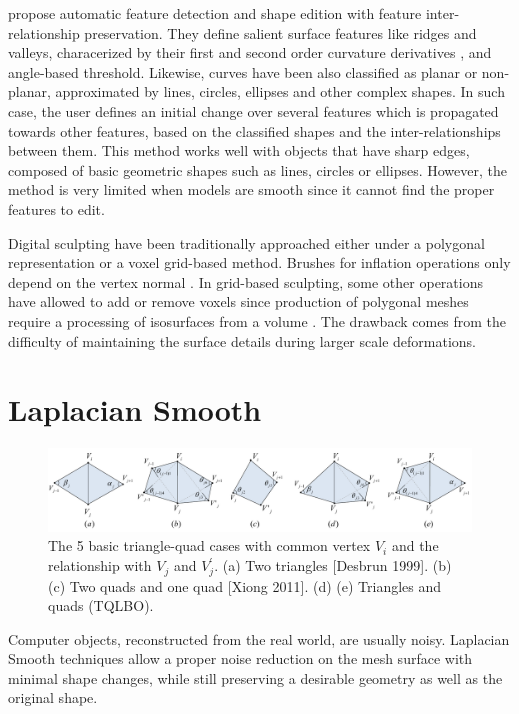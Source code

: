 \documentclass[10pt, conference]{IEEEtran}
\begin{document}
\cite{Gal2009} propose automatic feature detection and shape edition
with feature inter-relationship preservation. They define salient
surface features like ridges and valleys, characerized by their first
and second order curvature derivatives \cite{Ohtake2004}, and angle-based
threshold. Likewise, curves have been also classified as planar or
non-planar, approximated by lines, circles, ellipses and other complex
shapes. In such case, the user defines an initial change over several
features which is propagated towards other features, based on the
classified shapes and the inter-relationships between them. This method
works well with objects that have sharp edges, composed of basic geometric
shapes such as lines, circles or ellipses. However, the method is
very limited when models are smooth since it cannot find the proper
features to edit.

Digital sculpting have been traditionally approached either under
a polygonal representation or a voxel grid-based method. Brushes for
inflation operations only depend on the vertex normal \cite{Stanculescu2011}.
In grid-based sculpting, some other operations have allowed to add
or remove voxels since production of polygonal meshes require a processing
of isosurfaces from a volume \cite{Galyean1991}. The drawback comes
from the difficulty of maintaining the surface details during larger
scale deformations.

\section{Laplacian Smooth\label{sec:Laplacian-Smooth}}
%
\begin{figure}[t]
\includegraphics[width=1\textwidth]{figs/beltrami}

\caption{\label{fig:LBO-basic-5-TQ}The 5 basic triangle-quad cases with common
vertex $V_{i}$ and the relationship with $V_{j}$ and $V_{j}^{\prime}$.
(a) Two triangles {[}Desbrun 1999{]}. (b) (c) Two quads and one quad
{[}Xiong 2011{]}. (d) (e) Triangles and quads (TQLBO).}
\end{figure}


Computer objects, reconstructed from the real world, are usually noisy.
Laplacian Smooth techniques allow a proper noise reduction on the
mesh surface with minimal shape changes, while still preserving a
desirable geometry as well as the original shape. 
\end{document}
